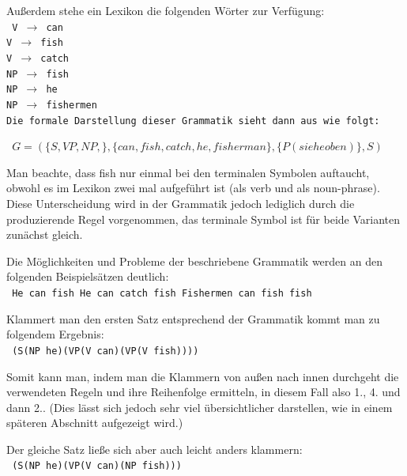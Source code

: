 \documentclass[12pt]{report}
\begin{document}
\rm

Außerdem stehe ein Lexikon die folgenden Wörter zur Verfügung:
\newline
\\
\tt
V $\rightarrow$ can\\
V $\rightarrow$ fish\\
V $\rightarrow$ catch\\
NP $\rightarrow$ fish\\
NP $\rightarrow$ he\\
NP $\rightarrow$ fishermen\\
\rm 
\newline
Die formale Darstellung dieser Grammatik sieht dann aus wie folgt:

\begin{center}
\tt
$G=(\lbrace S,VP,NP,\rbrace ,\lbrace can, fish, catch, he, fisherman\rbrace ,\lbrace P(siehe oben)\rbrace ,S)$
\rm
\end{center}

Man beachte, dass \glqq  fish\grqq{} nur einmal bei den terminalen Symbolen auftaucht, obwohl es im Lexikon zwei mal aufgeführt ist (als verb und als noun-phrase). Diese Unterscheidung wird in der Grammatik jedoch lediglich durch die produzierende Regel vorgenommen, das terminale Symbol ist für beide Varianten zunächst gleich.

Die Möglichkeiten und Probleme der beschriebene Grammatik werden an den folgenden Beispielsätzen deutlich:
\\

\tt
\glqq  He can fish\grqq{}
\glqq  He can catch fish\grqq{}
\glqq  Fishermen can fish fish\grqq{}
\rm

Klammert man den ersten Satz entsprechend der Grammatik kommt man zu folgendem Ergebnis:\\

\tt 
(S(NP he)(VP(V can)(VP(V fish))))\\
\rm

Somit kann man, indem man die Klammern von außen nach innen durchgeht die verwendeten Regeln und ihre Reihenfolge ermitteln, in diesem Fall also 1., 4. und dann 2.. (Dies lässt sich jedoch sehr viel übersichtlicher darstellen, wie in einem späteren Abschnitt aufgezeigt wird.)

Der gleiche Satz ließe sich aber auch leicht anders klammern:\\

\tt
(S(NP he)(VP(V can)(NP fish)))\\
\rm
\end{document}
